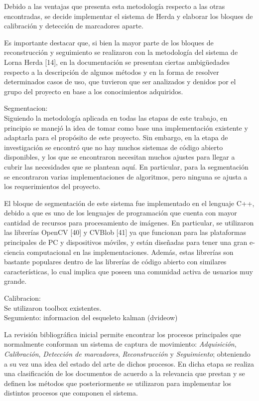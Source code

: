 Debido a las ventajas que presenta esta metodología respecto a las otras encontradas,
se decide implementar el sistema de Herda y elaborar los bloques de
calibración y detección de marcadores aparte.

Es importante destacar que, si bien la
mayor parte de los bloques de reconstrucción y seguimiento se realizaron con la
metodología del sistema de Lorna Herda [14], en la documentación se presentan
ciertas ambigüedades respecto a la descripción de algunos métodos y en la forma
de resolver determinados casos de uso, que tuvieron que ser analizados y denidos
por el grupo del proyecto en base a los conocimientos adquiridos.



Segmentacion:\\

Siguiendo la metodología aplicada en todas las etapas de este trabajo, en principio
se manejó la idea de tomar como base una implementación existente y adaptarla
para el propósito de este proyecto. Sin embargo, en la etapa de investigación
se encontró que no hay muchos sistemas de código abierto disponibles, y los que se
encontraron necesitan muchos ajustes para llegar a cubrir las necesidades que se
plantean aquí. En particular, para la segmentación se encontraron varias implementaciones
de algoritmos, pero ninguna se ajusta a los requerimientos del proyecto.

El bloque de segmentación de este sistema fue implementado en el lenguaje
C++, debido a que es uno de los lenguajes de programación que cuenta con mayor
cantidad de recursos para procesamiento de imágenes. En particular, se utilizaron
las librerías OpenCV [40] y CVBlob [41] ya que funcionan para las plataformas
principales de PC y dispositivos móviles, y están diseñadas para tener una gran e-
ciencia computacional en las implementaciones. Además, estas librerías son bastante
populares dentro de las librerías de código abierto con similares características,
lo cual implica que poseen una comunidad activa de usuarios muy grande.

Calibracion:\\

Se utilizaron toolbox existentes.\\



Segumiento:
	informacion del esqueleto
	kalman (dvideow)
	
	

La revisión bibliográfica inicial permite encontrar los procesos principales que normalmente conforman un sistema de captura de movimiento: \emph{Adquisición}, \emph{Calibración}, \emph{Detección de marcadores}, \emph{Reconstrucción} y \emph{Seguimiento};  obteniendo a su vez una idea del estado del arte de dichos procesos. En dicha etapa se realiza una clasificación de los documentos de acuerdo a la relevancia que prestan y se definen los métodos que posteriormente se utilizaron para implementar los distintos procesos que componen el sistema. \\ 


